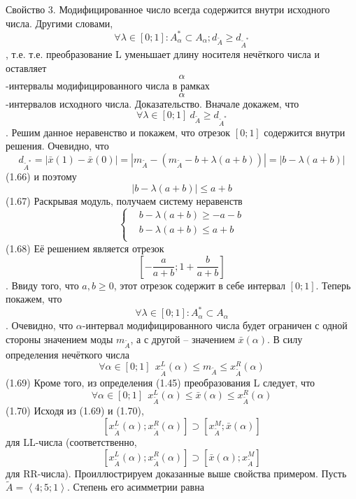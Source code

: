 Свойство 3. Модифицированное число всегда содержится внутри исходного числа. Другими словами, \[\forall \lambda \in \left[ 0;1 \right]:A_{\alpha }^{*}\subset {{A}_{\alpha }};{{d}_{{\tilde{A}}}}\ge {{d}_{{{{\tilde{A}}}^{*}}}}\], т.е. т.е. преобразование L уменьшает длину носителя нечёткого числа и оставляет \[\alpha \]-интервалы модифицированного числа в рамках \[\alpha \]-интервалов исходного числа.
Доказательство. Вначале докажем, что \[\forall \lambda \in \left[ 0;1 \right]\ {{d}_{{\tilde{A}}}}\ge {{d}_{{{{\tilde{A}}}^{*}}}}\]. Решим данное неравенство и покажем, что отрезок $\left[ 0;1 \right]$ содержится внутри решения. Очевидно, что 
	\[{{d}_{{{{\tilde{A}}}^{*}}}}=\left| \bar{x}\left( 1 \right)-\bar{x}\left( 0 \right) \right|=\left| {{m}_{{\tilde{A}}}}-\left( {{m}_{{\tilde{A}}}}-b+\lambda \left( a+b \right) \right) \right|=\left| b-\lambda \left( a+b \right) \right|\] 	(1.66)
и поэтому
	\[\left| b-\lambda (a+b) \right|\le a+b\] 	(1.67)
Раскрывая модуль, получаем систему неравенств
	\[\left\{ \begin{aligned}
  & b-\lambda \left( a+b \right)\ge -a-b \\ 
 & b-\lambda \left( a+b \right)\le a+b \\ 
\end{aligned} \right.\] 	(1.68)
Её решением является отрезок \[\left[ -\frac{a}{a+b};1+\frac{b}{a+b} \right]\]. Ввиду того, что $a,b\ge 0$, этот отрезок содержит в себе интервал $\left[ 0;1 \right]$.
Теперь покажем, что \[\forall \lambda \in \left[ 0;1 \right]:A_{\alpha }^{*}\subset {{A}_{\alpha }}\]. Очевидно, что $\alpha $-интервал модифицированного числа будет ограничен с одной стороны значением моды ${{m}_{{\tilde{A}}}}$, а с другой – значением $\bar{x}\left( \alpha  \right)$. В силу определения нечёткого числа
	\[\forall \alpha \in \left[ 0;1 \right]\ \ x_{{\tilde{A}}}^{L}(\alpha )\le {{m}_{{\tilde{A}}}}\le x_{{\tilde{A}}}^{R}(\alpha )\] 	(1.69)
Кроме того, из определения (1.45) преобразования L следует, что
	\[\forall \alpha \in \left[ 0;1 \right]\ \ x_{{\tilde{A}}}^{L}(\alpha )\le \bar{x}(\alpha )\le x_{{\tilde{A}}}^{R}(\alpha )\] 	(1.70)
Исходя из (1.69) и (1.70), \[\left[ x_{{\tilde{A}}}^{L}(\alpha );x_{{\tilde{A}}}^{R}(\alpha ) \right]\supset \left[ x_{{\tilde{A}}}^{M};\bar{x}(\alpha ) \right]\]  для LL-числа (соответственно, \[\left[ x_{{\tilde{A}}}^{L}(\alpha );x_{{\tilde{A}}}^{R}(\alpha ) \right]\supset \left[ \bar{x}(\alpha );x_{{\tilde{A}}}^{M} \right]\] для RR-числа).
Проиллюстрируем доказанные выше свойства примером. Пусть $\tilde{A}=\left\langle 4;5;1 \right\rangle $. Степень его асимметрии равна
